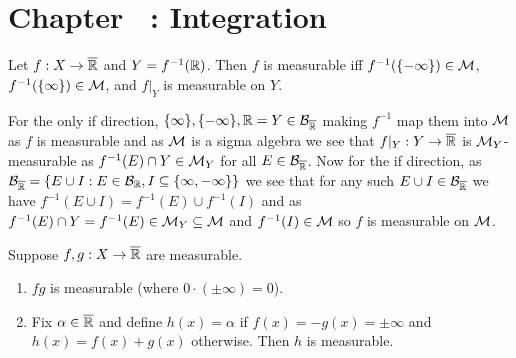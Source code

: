 \documentclass[12pt,a4paper]{article}
\begin{document}
\section*{Chapter \thesection\ : Integration}
\begin{problem}\label{prob:2-1}
Let $f: X \to \overline{\mathbb{R}}$ and $Y = f^{-1}(\mathbb{R})$. Then $f$ is measurable iff $f^{-1}(\{-\infty\}) \in \mathcal{M}$, $f^{-1}(\{\infty\}) \in \mathcal{M}$, and $f|_Y$ is measurable on $Y$.
\end{problem}
\begin{solution}
    For the only if direction, $\{\infty\},\{-\infty\},\mathbb{R}=Y\in\mathcal B_{\overline{\mathbb{R}}}$ making $f^{-1}$ map them into $\mathcal{M}$ as $f$ is measurable and as $\mathcal{M}$ is a sigma algebra we see that $f\vert_Y:Y\to\overline{\mathbb{R}}$ is $\mathcal{M}_Y$-measurable as $f^{-1}(E)\cap Y\in\mathcal{M}_Y$ for all $E\in\mathcal B_{\overline{\mathbb{R}}}$. 
    Now for the if direction, as $\mathcal B_{\overline{\mathbb{R}}}=\{E\cup I:E\in\mathcal B_{\mathbb{R}}, I\subseteq\{\infty,-\infty\}\}$ we see that for any such $E\cup I\in\mathcal B_{\overline{\mathbb{R}}}$ we have $f^{-1}(E\cup I)=f^{-1}(E)\cup f^{-1}(I)$ and as $f^{-1}(E)\cap Y=f^{-1}(E)\in\mathcal{M}_Y\subseteq\mathcal{M}$ and $f^{-1}(I)\in\mathcal{M}$ so $f$ is measurable on $\mathcal{M}$.
\end{solution}
\begin{problem}\label{prob:2-2}
Suppose $f, g: X \to \overline{\mathbb{R}}$ are measurable.
\begin{enumerate}[label=\alph*.]
    \item $fg$ is measurable (where $0 \cdot (\pm\infty) = 0$).
    \item Fix $\alpha \in \overline{\mathbb{R}}$ and define $h(x) = \alpha$ if $f(x) = -g(x) = \pm\infty$ and $h(x) = f(x) + g(x)$ otherwise. Then $h$ is measurable.
\end{enumerate}
\end{problem}
\end{document}
